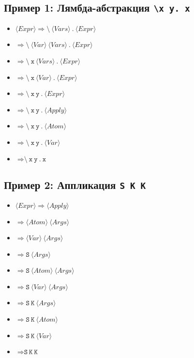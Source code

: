 \documentclass{article}
\begin{document}
\subsection{Пример 1: Лямбда-абстракция \texttt{\textbackslash x y. x}}
\begin{itemize}
    \item $\langle Expr \rangle \Rightarrow \texttt{\textbackslash} \ \langle Vars \rangle \ \texttt{.} \ \langle Expr \rangle$
    \item $\Rightarrow \texttt{\textbackslash} \ \langle Var \rangle \ \langle Vars \rangle \ \texttt{.} \ \langle Expr \rangle$
    \item $\Rightarrow \texttt{\textbackslash} \ \texttt{x} \ \langle Vars \rangle \ \texttt{.} \ \langle Expr \rangle$
    \item $\Rightarrow \texttt{\textbackslash} \ \texttt{x} \ \langle Var \rangle \ \texttt{.} \ \langle Expr \rangle$
    \item $\Rightarrow \texttt{\textbackslash} \ \texttt{x} \ \texttt{y} \ \texttt{.} \ \langle Expr \rangle$
    \item $\Rightarrow \texttt{\textbackslash} \ \texttt{x} \ \texttt{y} \ \texttt{.} \ \langle Apply \rangle$
    \item $\Rightarrow \texttt{\textbackslash} \ \texttt{x} \ \texttt{y} \ \texttt{.} \ \langle Atom \rangle$
    \item $\Rightarrow \texttt{\textbackslash} \ \texttt{x} \ \texttt{y} \ \texttt{.} \ \langle Var \rangle$
    \item $\Rightarrow \texttt{\textbackslash} \ \texttt{x} \ \texttt{y} \ \texttt{.} \ \texttt{x}$
\end{itemize}

\subsection{Пример 2: Аппликация \texttt{S K K}}
\begin{itemize}
    \item $\langle Expr \rangle \Rightarrow \langle Apply \rangle$
    \item $\Rightarrow \langle Atom \rangle \ \langle Args \rangle$
    \item $\Rightarrow \langle Var \rangle \ \langle Args \rangle$
    \item $\Rightarrow \texttt{S} \ \langle Args \rangle$
    \item $\Rightarrow \texttt{S} \ \langle Atom \rangle \ \langle Args \rangle$
    \item $\Rightarrow \texttt{S} \ \langle Var \rangle \ \langle Args \rangle$
    \item $\Rightarrow \texttt{S} \ \texttt{K} \ \langle Args \rangle$
    \item $\Rightarrow \texttt{S} \ \texttt{K} \ \langle Atom \rangle$
    \item $\Rightarrow \texttt{S} \ \texttt{K} \ \langle Var \rangle$
    \item $\Rightarrow \texttt{S} \ \texttt{K} \ \texttt{K}$
\end{itemize}
\end{document}
